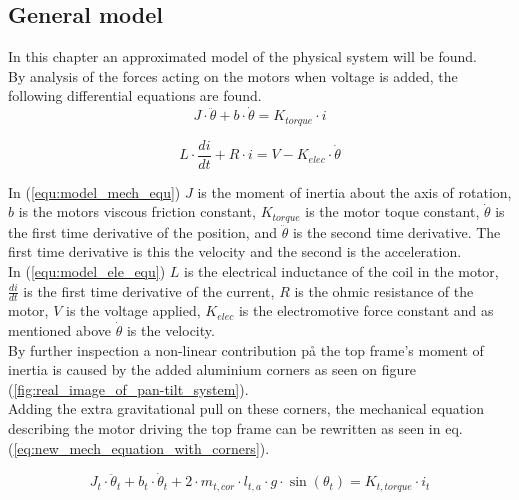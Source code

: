 \documentclass[../../main]{subfiles}
\begin{document}
\subsection{General model}
\label{ch:General_model}

In this chapter an approximated model of the physical system will be found.\\

By analysis of the forces acting on the motors when voltage is added, the following differential equations are found.\\

\begin{equation}
  \label{equ:model_mech_equ}
  J\cdot \ddot \theta + b\cdot \dot \theta = K_{torque}\cdot i
\end{equation}

\begin{equation}
  \label{equ:model_ele_equ}
  L\cdot \frac{di}{dt} + R\cdot i = V - K_{elec}\cdot \dot \theta
\end{equation}

In (\ref{equ:model_mech_equ}) $J$ is the moment of inertia about the axis of rotation, $b$ is the motors viscous friction constant, $K_{torque}$ is the motor toque constant, $\dot \theta$ is the first time derivative of the position, and $\ddot \theta$ is the second time derivative. The first time derivative is this the velocity and the second is the acceleration.\\
In (\ref{equ:model_ele_equ}) $L$ is the electrical inductance of the coil in the motor, $\frac{di}{dt}$ is the first time derivative of the current, $R$ is the ohmic resistance of the motor, $V$ is the voltage applied, $K_{elec}$ is the electromotive force constant and as mentioned above $\dot \theta$ is the velocity.\\

By further inspection a non-linear contribution på the top frame's moment of inertia is caused by the added aluminium corners as seen on figure (\ref{fig:real_image_of_pan-tilt_system}).\\
Adding the extra gravitational pull on these corners, the mechanical equation describing the motor driving the top frame can be rewritten as seen in eq. (\ref{eq:new_mech_equation_with_corners}).

\begin{equation}
  \label{eq:new_mech_equation_with_corners}
  J_t\cdot \ddot \theta_t + b_t\cdot \dot \theta_t + 2\cdot m_{t,cor} \cdot l_{t,a} \cdot g \cdot \sin(\theta_t) = K_{t,torque}\cdot i_t
\end{equation}
\end{document}
